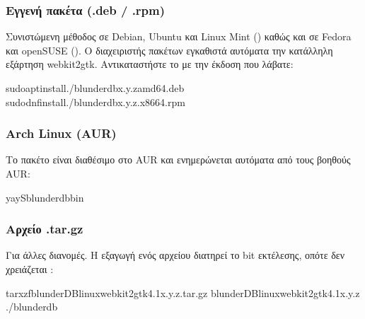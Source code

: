 \documentclass[letterpaper,10pt,greek]{sphinxmanual}
\begin{document}
\subsubsection{Εγγενή πακέτα (.deb / .rpm)}
\label{\detokenize{telecharge_install:paquets-natifs-deb-rpm}}
\sphinxAtStartPar
Συνιστώμενη μέθοδος σε Debian, Ubuntu και Linux Mint () καθώς και σε Fedora και openSUSE (). Ο διαχειριστής πακέτων εγκαθιστά αυτόματα την κατάλληλη εξάρτηση webkit2gtk. Αντικαταστήστε το  με την έκδοση που λάβατε:

\begin{sphinxVerbatim}[commandchars=\\\{\}]
sudoaptinstall./blunderdb\PYGZus{}x.y.z\PYGZus{}amd64.deb
sudodnfinstall./blunderdb\PYGZhy{}x.y.z.x86\PYGZus{}64.rpm
\end{sphinxVerbatim}


\subsubsection{Arch Linux (AUR)}
\label{\detokenize{telecharge_install:arch-linux-aur}}
\sphinxAtStartPar
Το πακέτο  είναι διαθέσιμο στο AUR και ενημερώνεται αυτόματα από τους βοηθούς AUR:

\begin{sphinxVerbatim}[commandchars=\\\{\}]
yay\PYGZhy{}Sblunderdb\PYGZhy{}bin
\end{sphinxVerbatim}


\subsubsection{Αρχείο .tar.gz}
\label{\detokenize{telecharge_install:archive-tar-gz}}
\sphinxAtStartPar
Για άλλες διανομές. Η εξαγωγή ενός αρχείου διατηρεί το bit εκτέλεσης, οπότε δεν χρειάζεται :

\begin{sphinxVerbatim}[commandchars=\\\{\}]
tarxzfblunderDB\PYGZhy{}linux\PYGZhy{}webkit2gtk\PYGZhy{}4.1\PYGZhy{}x.y.z.tar.gz
blunderDB\PYGZhy{}linux\PYGZhy{}webkit2gtk\PYGZhy{}4.1\PYGZhy{}x.y.z
./blunderdb
\end{sphinxVerbatim}
\end{document}
